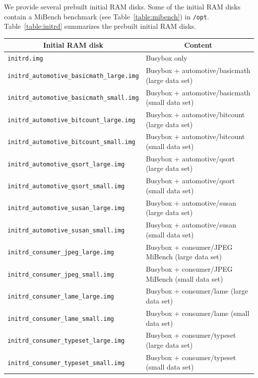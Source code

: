 We provide several prebuilt initial RAM disks.
Some of the initial RAM disks contain a MiBench benchmark (see Table~\ref{table:mibench}) in \texttt{/opt}.
Table~\ref{table:initrd} summarizes the prebuilt initial RAM disks.
\begin{table}[!h]
	\begin{center}
		\begin{tabular}{|l|l|}
		\hline
		\multicolumn{1}{|c|}{\textbf{Initial RAM disk}} & \multicolumn{1}{|c|}{\textbf{Content}}\\
		\hline
		\texttt{initrd.img} & Busybox only\\
		\hline
		\texttt{initrd\_automotive\_basicmath\_large.img} & Busybox + automotive/basicmath (large data set)\\
		\hline
		\texttt{initrd\_automotive\_basicmath\_small.img} & Busybox + automotive/basicmath (small data set)\\
		\hline
		\texttt{initrd\_automotive\_bitcount\_large.img} & Busybox + automotive/bitcount (large data set)\\
		\hline
		\texttt{initrd\_automotive\_bitcount\_small.img} & Busybox + automotive/bitcount (small data set)\\
		\hline
		\texttt{initrd\_automotive\_qsort\_large.img} & Busybox + automotive/qsort (large data set)\\
		\hline
		\texttt{initrd\_automotive\_qsort\_small.img} & Busybox + automotive/qsort (small data set)\\
		\hline
		\texttt{initrd\_automotive\_susan\_large.img} & Busybox + automotive/susan (large data set)\\
		\hline
		\texttt{initrd\_automotive\_susan\_small.img} & Busybox + automotive/susan (small data set)\\
		\hline
		\texttt{initrd\_consumer\_jpeg\_large.img} & Busybox + consumer/JPEG MiBench (large data set)\\
		\hline
		\texttt{initrd\_consumer\_jpeg\_small.img} & Busybox + consumer/JPEG MiBench (small data set)\\
		\hline
		\texttt{initrd\_consumer\_lame\_large.img} & Busybox + consumer/lame (large data set)\\
		\hline
		\texttt{initrd\_consumer\_lame\_small.img} & Busybox + consumer/lame (small data set)\\
		\hline
		\texttt{initrd\_consumer\_typeset\_large.img} & Busybox + consumer/typeset (large data set)\\
		\hline
		\texttt{initrd\_consumer\_typeset\_small.img} & Busybox + consumer/typeset (small data set)\\

\end{tabular}
\end{center}
\end{table}
